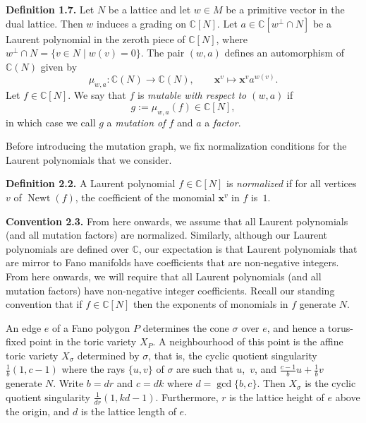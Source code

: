 \par

\par\noindent\textbf{Definition 1.7.} 
Let $N$ be a lattice and let $w\in M$ be a primitive vector in the dual lattice. Then $w$ induces a grading on $\mathbb{C}[N]$. Let $a\in\mathbb{C}[w^\perp\cap N]$ be a Laurent polynomial in the zeroth piece of $\mathbb{C}[N]$, where $w^\perp\cap N=\{v\in N\mid w(v)=0\}$. The pair $(w,a)$ defines an automorphism of $\mathbb{C}(N)$ given by
\[
\mu_{w,a}:\mathbb{C}(N)\rightarrow\mathbb{C}(N),\qquad\bm{x}^v\mapsto\bm{x}^v a^{w(v)}.
\]
Let $f\in\mathbb{C}[N]$. We say that $f$ is \emph{mutable with respect to $(w,a)$} if
\[
g:=\mu_{w,a}(f)\in\mathbb{C}[N],
\]
in which case we call $g$ a \emph{mutation of $f$} and $a$ a \emph{factor}.

\par

Before introducing the mutation graph, we fix normalization conditions for the Laurent polynomials that we consider.

\par\noindent\textbf{Definition 2.2.}  \label{def:normalization}
A Laurent polynomial $f\in\mathbb{C}[N]$ is \emph{normalized} if for all vertices $v$ of $\operatorname{Newt}(f)$, the coefficient of the monomial $\bm{x}^v$ in $f$ is~$1$.

\par

\par\noindent\textbf{Convention 2.3.} 
From here onwards, we assume that all Laurent polynomials (and all mutation factors) are normalized. Similarly, although our Laurent polynomials are defined over $\mathbb{C}$, our expectation is that Laurent polynomials that are mirror to Fano manifolds have coefficients that are non-negative integers. From here onwards, we will require that all Laurent polynomials (and all mutation factors) have non-negative integer coefficients. Recall our standing convention that if $f \in \mathbb{C}[N]$ then the exponents of monomials in $f$ generate $N$.

\par

An edge $e$ of a Fano polygon $P$ determines the cone $\sigma$ over $e$, and hence a torus-fixed point in the toric variety $X_P$. A neighbourhood of this point is the affine toric variety $X_\sigma$ determined by $\sigma$, that is, the cyclic quotient singularity $\frac{1}{b}(1,c-1)$ where the rays $\{u,v\}$ of $\sigma$ are such that $u$,~$v$, and $\frac{c-1}{b} u + \frac{1}{b}v$ generate $N$. Write $b = dr$ and $c = dk$ where $d = \gcd\{b,c\}$. Then $X_\sigma$ is the cyclic quotient singularity $\frac{1}{dr}(1,kd-1)$. Furthermore, $r$ is the lattice height of $e$ above the origin, and $d$ is the lattice length of $e$.

